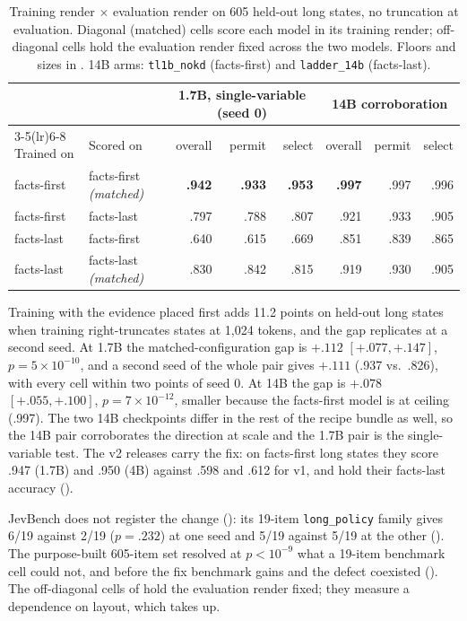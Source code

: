\begin{table}[t]
  \centering
  \caption{Training render $\times$ evaluation render on 605 held-out long states, no truncation at
  evaluation. Diagonal (matched) cells score each model in its training render; off-diagonal cells hold
  the evaluation render fixed across the two models. Floors and sizes in . 14B arms:
  \texttt{tl1b\_nokd} (facts-first) and \texttt{ladder\_14b} (facts-last).}
  \label{tab:twobytwo}
  \footnotesize
  \setlength{\tabcolsep}{4pt}
  \begin{tabular}{llrrrrrr}
    \toprule
    & & \multicolumn{3}{c}{1.7B, single-variable (seed 0)} & \multicolumn{3}{c}{14B corroboration} \\
    \cmidrule(lr){3-5}\cmidrule(lr){6-8}
    Trained on & Scored on & overall & permit & select & overall & permit & select \\
    \midrule
    facts-first & facts-first \emph{(matched)} & \textbf{.942} & \textbf{.933} & \textbf{.953} & \textbf{.997} & .997 & .996 \\
    facts-first & facts-last & .797 & .788 & .807 & .921 & .933 & .905 \\
    facts-last & facts-first & .640 & .615 & .669 & .851 & .839 & .865 \\
    facts-last & facts-last \emph{(matched)} & .830 & .842 & .815 & .919 & .930 & .905 \\
    \bottomrule
  \end{tabular}
\end{table}

Training with the evidence placed first adds 11.2 points on held-out long states when training
right-truncates states at 1{,}024 tokens, and the gap replicates at a second seed. At 1.7B the
matched-configuration gap is $+.112$ $[+.077, +.147]$, $p = 5\times10^{-10}$, and a second seed of the
whole pair gives $+.111$ (.937 vs.\ .826), with every cell within two points of seed 0. At 14B the gap
is $+.078$ $[+.055, +.100]$, $p = 7\times10^{-12}$, smaller because the facts-first model is at ceiling
(.997). The two 14B checkpoints differ in the rest of the recipe bundle as well, so the 14B pair
corroborates the direction at scale and the 1.7B pair is the single-variable test. The v2 releases carry
the fix: on facts-first long states they score .947 (1.7B) and .950 (4B) against .598 and .612 for v1,
and hold their facts-last accuracy ().

JevBench does not register the change (): its 19-item \texttt{long\_policy}
family gives 6/19 against 2/19 ($p = .232$) at one seed and 5/19 against 5/19 at the other
(). The purpose-built 605-item set resolved at $p < 10^{-9}$ what a 19-item
benchmark cell could not, and before the fix benchmark gains and the defect coexisted
(). The off-diagonal cells of  hold the
evaluation render fixed; they measure a dependence on layout, which  takes up.

